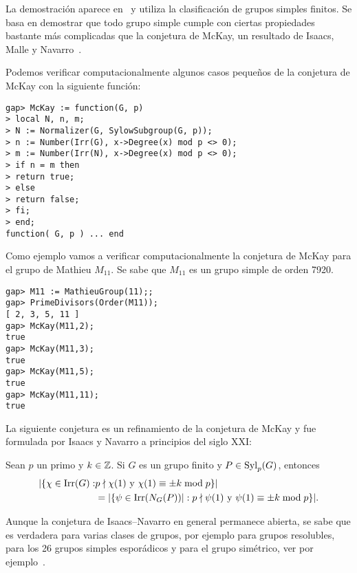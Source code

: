 La demostración aparece en~\cite{MR3549625} y utiliza 
la clasificación de grupos simples finitos. Se basa en 
demostrar que todo grupo simple cumple con ciertas propiedades 
bastante más complicadas que la conjetura de McKay, 
un resultado de Isaacs, Malle y Navarro~\cite{MR2336079}. 

Podemos verificar computacionalmente algunos casos pequeños 
de la conjetura de McKay con la siguiente función:

\begin{lstlisting}
gap> McKay := function(G, p)
> local N, n, m;
> N := Normalizer(G, SylowSubgroup(G, p));
> n := Number(Irr(G), x->Degree(x) mod p <> 0);
> m := Number(Irr(N), x->Degree(x) mod p <> 0);
> if n = m then
> return true;
> else
> return false;
> fi;
> end;
function( G, p ) ... end
\end{lstlisting}

Como ejemplo vamos a verificar computacionalmente la conjetura de McKay para el grupo 
de Mathieu $M_{11}$. Se sabe que $M_{11}$ es un grupo simple de orden 7920. 

\begin{lstlisting}
gap> M11 := MathieuGroup(11);;
gap> PrimeDivisors(Order(M11));
[ 2, 3, 5, 11 ]
gap> McKay(M11,2);
true
gap> McKay(M11,3);
true
gap> McKay(M11,5);
true
gap> McKay(M11,11);
true
\end{lstlisting}

La siguiente conjetura 
es un refinamiento de la conjetura de McKay y 
fue formulada por Isaacs y Navarro a principios del siglo XXI:

\begin{conjecture}
Sean $p$ un primo y $k\in\mathbb{Z}$. 
Si $G$ es un grupo finito y $P\in\mathrm{Syl}_p(G)$, entonces
\begin{align*}
|\{\chi\in\operatorname{Irr}(G):&p\nmid \chi(1)\text{ y }\chi(1)\equiv\pm k\bmod p\}|\\
&=|\{\psi\in\operatorname{Irr}(N_G(P))|:p\nmid\psi(1)\text{ y }\psi(1)\equiv\pm k\bmod p\}|.
\end{align*}
\end{conjecture}

Aunque la conjetura de Isaacs--Navarro en general permanece abierta, 
se sabe que es verdadera para varias clases de grupos, por ejemplo 
para grupos resolubles, para los 26 grupos simples esporádicos y para el grupo simétrico, 
ver por ejemplo~\cite{MR1935849}. 

